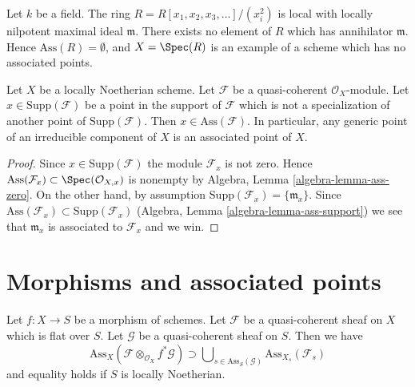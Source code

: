 \begin{example}
\label{example-no-associated-prime}
Let $k$ be a field. The ring $R = R[x_1, x_2, x_3, \ldots]/(x_i^2)$
is local with locally nilpotent maximal ideal $\mathfrak m$.
There exists no element of $R$ which has annihilator $\mathfrak m$.
Hence $\text{Ass}(R) = \emptyset$, and $X = \Spec(R)$
is an example of a scheme which has no associated points.
\end{example}

\begin{lemma}
\label{lemma-minimal-support-in-ass}
Let $X$ be a locally Noetherian scheme.
Let $\mathcal{F}$ be a quasi-coherent $\mathcal{O}_X$-module.
Let $x \in \text{Supp}(\mathcal{F})$ be a point in the support
of $\mathcal{F}$ which is not a specialization of another point of
$\text{Supp}(\mathcal{F})$. Then $x \in \text{Ass}(\mathcal{F})$.
In particular, any generic point of an irreducible component of $X$
is an associated point of $X$.
\end{lemma}

\begin{proof}
Since $x \in \text{Supp}(\mathcal{F})$ the module $\mathcal{F}_x$
is not zero. Hence
$\text{Ass}(\mathcal{F}_x) \subset \Spec(\mathcal{O}_{X, x})$
is nonempty by
Algebra, Lemma \ref{algebra-lemma-ass-zero}.
On the other hand, by assumption
$\text{Supp}(\mathcal{F}_x) = \{\mathfrak m_x\}$.
Since
$\text{Ass}(\mathcal{F}_x) \subset \text{Supp}(\mathcal{F}_x)$
(Algebra, Lemma \ref{algebra-lemma-ass-support})
we see that $\mathfrak m_x$ is associated to $\mathcal{F}_x$
and we win.
\end{proof}






\section{Morphisms and associated points}
\label{section-morphisms-associated}

\begin{lemma}
\label{lemma-bourbaki}
Let $f : X \to S$ be a morphism of schemes.
Let $\mathcal{F}$ be a quasi-coherent sheaf on $X$ which is flat over $S$.
Let $\mathcal{G}$ be a quasi-coherent sheaf on $S$.
Then we have
$$
\text{Ass}_X(\mathcal{F} \otimes_{\mathcal{O}_X} f^*\mathcal{G})
\supset
\bigcup\nolimits_{s \in \text{Ass}_S(\mathcal{G})}
\text{Ass}_{X_s}(\mathcal{F}_s)
$$
and equality holds if $S$ is locally Noetherian.
\end{lemma}

